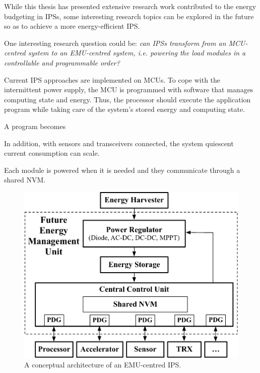 While this thesis has presented extensive research work contributed to the energy budgeting in IPSs, some interesting research topics can be explored in the future so as to achieve a more energy-efficient IPS. 

One interesting research question could be: \textit{can IPSs transform from an MCU-centred system to an EMU-centred system, i.e. powering the load modules in a controllable and programmable order?}

Current IPS approaches are implemented on MCUs.
To cope with the intermittent power supply, the MCU is programmed with software that manages computing state and energy. 
Thus, the processor should execute the application program while taking care of the system's stored energy and computing state. 


A program becomes 





In addition, with sensors and transceivers connected, the system quiescent current consumption can scale.

Each module is powered when it is needed and they communicate through a shared NVM. 

\begin{figure}
  \centering
  \includegraphics[width=0.8\columnwidth]{ch6_conclusion/figures/EMUIPSarch.pdf}
  \caption{A conceptual architecture of an EMU-centred IPS.}
  \label{fig:emuips}
\end{figure}

